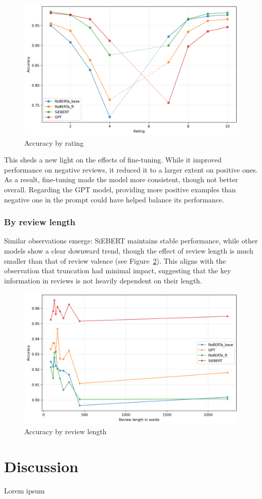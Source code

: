 \documentclass{article}
\begin{document}
\begin{figure}
  \centering
  \includegraphics[width=\textwidth]{accuracy_vs_ratings.png}
  \caption{Accuracy by rating}
  \label{fig:accuracy-ratings}
\end{figure}

This sheds a new light on the effects of fine-tuning. While it improved performance on negative reviews, it reduced it to a larger extent on positive ones. As a result, fine-tuning made the model more consistent, though not better overall. Regarding the GPT model, providing more positive examples than negative one in the prompt could have helped balance its performance.

\subsubsection{By review length}

Similar observations emerge: SiEBERT maintains stable performance, while other models show a clear downward trend, though the effect of review length is much smaller than that of review valence (see Figure~\ref{fig:accuracy-length}). This aligns with the observation that truncation had minimal impact, suggesting that the key information in reviews is not heavily dependent on their length.

\begin{figure}
  \centering
  \includegraphics[width=\textwidth]{accuracy_vs_wordcount.png}
  \caption{Accuracy by review length}
  \label{fig:accuracy-length}
\end{figure}

\section{Discussion}

Lorem ipsum



\end{document}
